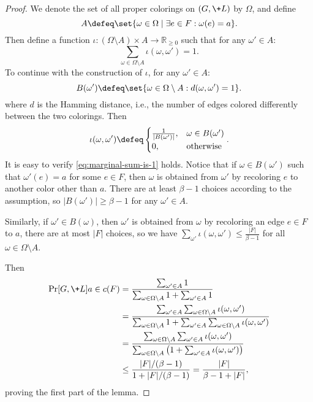 \documentclass[a4paper,11pt]{article}
\begin{document}
\begin{proof}
We denote the set of all proper colorings on $(G, \+L)$ by $\Omega$, and define
\[A \defeq \set{\omega\in \Omega \mid \exists e\in F: \omega(e) = a}.\]
Then define a function $\iota: (\Omega\setminus A)\times A\to \mathbb R_{\ge 0} $ such that for any $\omega'\in A$:
\begin{equation}\label{eq:marginal-sum-is-1}
\sum_{\omega\in \Omega\setminus A} \iota(\omega, \omega') = 1.
\end{equation}
To continue with the construction of $\iota$, for any $\omega' \in A$:
\[
    B(\omega')\defeq \set{\omega\in \Omega\setminus A : d(\omega, \omega') = 1}.
\]
where $d$ is the Hamming distance, i.e., the number of edges colored differently between the two colorings.
Then
\begin{align*}
\iota(\omega, \omega') \defeq
\begin{cases}
\frac{1}{|B(\omega')|},& \omega\in B(\omega')\\
0, &\text{otherwise}
\end{cases}.
\end{align*}
It is easy to verify \cref{eq:marginal-sum-is-1} holds.
Notice that if $\omega\in B(\omega')$ such that $\omega'(e) = a$ for some $e\in F$,
then $\omega$ is obtained from $\omega'$ by recoloring $e$ to another color other than $a$. 
There are at least $\beta-1$ choices according to the assumption, so $|B(\omega')|\ge \beta-1$ for any $\omega'\in A$.

Similarly, if $\omega'\in B(\omega)$, then $\omega'$ is obtained from $\omega$ by recoloring an edge $e\in F$ to $a$,
there are at most $|F|$ choices,
so we have $\sum_{\omega'} \iota(\omega, \omega') \le \frac{|F|}{\beta-1}$ for all $\omega\in \Omega\setminus A$.

Then
\begin{align*}
\Pr[G,\+L]{a\in c(F)}
&= \frac{\sum_{\omega'\in A}1}{\sum_{\omega\in \Omega\setminus A} 1 + \sum_{\omega'\in A}1}\\
&= \frac{\sum_{\omega'\in A}\sum_{\omega\in \Omega\setminus A} \iota(\omega, \omega')}
        {\sum_{\omega\in \Omega\setminus A} 1 + \sum_{\omega'\in A}\sum_{\omega\in \Omega\setminus A} \iota(\omega, \omega')}\\
&= \frac{\sum_{\omega\in \Omega\setminus A} \sum_{\omega'\in A} \iota(\omega, \omega')}
        {\sum_{\omega\in \Omega\setminus A} \left(1 + \sum_{\omega'\in A}\iota(\omega, \omega')\right)}\\
&\le \frac{|F|/(\beta-1)}{1 + |F|/(\beta-1)} = \frac{|F|}{\beta-1+|F|},
\end{align*}
proving the first part of the lemma.


\end{proof}
\end{document}
